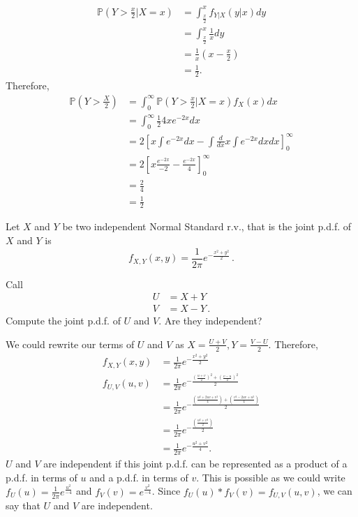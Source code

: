 \documentclass[letterpaper,12pt,addpoints]{exam}
\begin{document}
\begin{questions}
\begin{parts}
\begin{solution}
\begin{align*}
    \mathbb{P}(Y>\frac{x}{2}|X=x)&=\int_{\frac{x}{2}}^xf_{Y|X}(y|x)dy\\
    &=\int_{\frac{x}{2}}^x\frac{1}{x}dy\\
    &=\frac{1}{x}(x-\frac{x}{2})\\
    &=\frac{1}{2}.
\end{align*} Therefore,
\begin{align*}
\mathbb{P}(Y>\frac{X}{2})&=\int_0^{\infty}\mathbb{P}(Y>\frac{x}{2}|X=x)f_X(x)dx\\
&=\int_0^{\infty}\frac{1}{2}4xe^{-2x}dx\\
&=2[x\int e^{-2x}dx-\int\frac{d}{dx}x\int e^{-2x}dxdx]^{\infty}_0\\
&=2[x\frac{e^{-2x}}{-2}-\frac{e^{-2x}}{4}]^{\infty}_0\\
&=\frac{2}{4}\\
&=\frac{1}{2}
\end{align*}
\end{solution}

\end{parts}

\vspace*{\fill}\eject




\question[15]
Let $X$ and $Y$ be two independent Normal Standard r.v., that is 
the joint p.d.f. of $X$ and $Y$ is
\[
 f_{X,Y}(x,y)=\frac 1{2\pi} e^{-\frac{x^2+y^2}2}\, .
\]

Call
\[
 \begin{aligned}  
  U&=X+Y\\
  V&=X-Y\,.
 \end{aligned}
\]
Compute the joint p.d.f. of $U$ and $V$. Are they independent?


\begin{solution}
We could rewrite our terms of $U$ and $V$ as $X=\frac{U+V}{2}, Y=\frac{V-U}{2}$. Therefore,
\begin{align*}
    f_{X,Y}(x,y)&=\frac 1{2\pi} e^{-\frac{x^2+y^2}2}\\
    f_{U,V}(u,v)&=\frac{1}{2\pi}e^{-\frac{(\frac{u+v}{2})^2+(\frac{v-u}{2})^2}{2}}\\
    &=\frac{1}{2\pi}e^{-\frac{(\frac{u^2+2uv+v^2}{4})+(\frac{v^2-2uv+u^2}{4})}{2}}\\
    &=\frac{1}{2\pi}e^{-\frac{(\frac{u^2+v^2}{2})}{2}}\\
    &=\frac{1}{2\pi}e^{-\frac{u^2+v^2}{4}}.
\end{align*} $U$ and $V$ are independent if this joint p.d.f. can be represented as a product of a p.d.f. in terms of $u$ and a p.d.f. in terms of $v$. This is possible as we could write $f_U(u)=\frac{1}{2\pi}e^{\frac{u^2}{-4}}$ and $f_V(v)=e^{\frac{v^2}{-4}}$. Since $f_U(u)*f_V(v)=f_{U,V}(u,v)$, we can say that $U$ and $V$ are independent.
\end{solution}


\end{questions}
\end{document}
